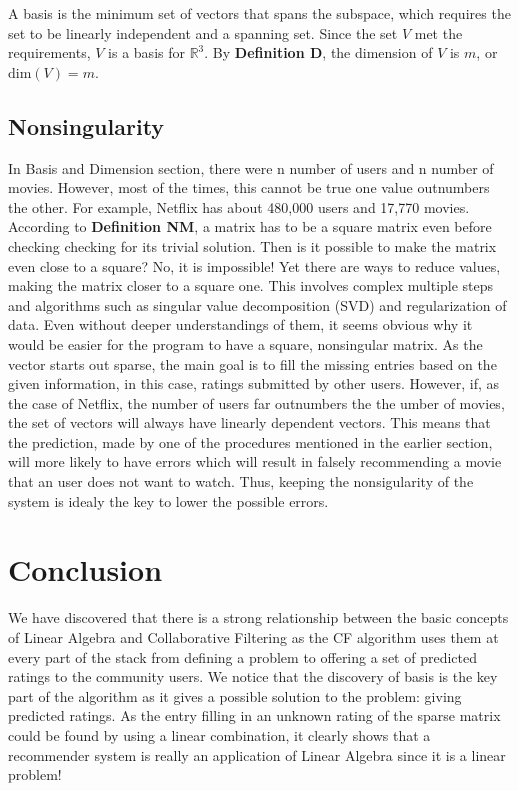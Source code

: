 \documentclass[paper=a4, fontsize=12pt]{scrartcl} %
\numberwithin{equation}{section} %
\numberwithin{figure}{section} %
\numberwithin{table}{section} %
\begin{document}
  A basis is the minimum set of vectors that spans the subspace, which requires
  the set to be linearly independent and a spanning set. Since the set \(V\) met
  the requirements, \(V\) is a basis for \(\mathbb{R}^3\). By \textbf{Definition
    D}, the dimension of \(V\) is \(m\), or \(\mbox{dim}(V) = m\).

  \subsection{Nonsingularity}

  In Basis and Dimension section, there were n number of users and n number of
  movies. However, most of the times, this cannot be true \textemdash one value
  outnumbers the other. For example, Netflix has about 480,000 users and 17,770 movies.
  According to \textbf{Definition NM}, a matrix has to be a square matrix even before
  checking checking for its trivial solution. Then is it possible to make the
  matrix even close to a square? No, it is impossible! Yet there are ways to
  reduce values, making the matrix closer to a square one. This involves complex
  multiple steps and algorithms such as singular value decomposition (SVD) and
  regularization of data. Even without deeper understandings of them, it seems
  obvious why it would be easier for the program to have a square, nonsingular
  matrix. As the vector starts out sparse, the main goal is to fill the missing
  entries based on the given information, in this case, ratings submitted by
  other users. However, if, as the case of Netflix, the number of users far
  outnumbers the the umber of movies, the set of vectors will always have
  linearly dependent vectors. This means that the prediction, made by one of the
  procedures mentioned in the earlier section, will more likely to have errors
  which will result in falsely recommending a movie that an user does not want
  to watch. Thus, keeping the nonsigularity of the system is idealy the key to
  lower the possible errors.

  \pagebreak
  
  \section{Conclusion}

  We have discovered that there is a strong relationship between the basic
  concepts of Linear Algebra and Collaborative Filtering as the CF algorithm uses
  them at every part of the stack from defining a problem to offering a set of
  predicted ratings to the community users. We notice that the discovery of
  basis is the key part of the algorithm as it gives a possible solution to the
  problem: giving predicted ratings. As the entry filling in an unknown rating
  of the sparse matrix could be found by using a linear combination, it clearly
  shows that a recommender system is really an application of Linear Algebra since
  it is a linear problem!
\end{document}

